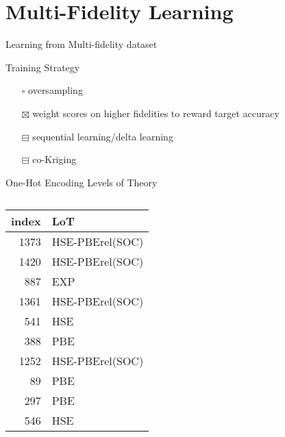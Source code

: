 \documentclass[10pt, aspectratio=169, presentation]{beamer}
\begin{document}
\section{Multi-Fidelity Learning}
\label{sec:orgacc14e3}
\begin{frame}[label={sec:org4baaeb2}]{Learning from Multi-fidelity dataset}
\begin{block}{Training Strategy}
\begin{itemize}
\item[{$\square$}] oversampling
\item[{$\boxtimes$}] weight scores on higher fidelities to reward target accuracy
\item[{$\boxminus$}] sequential learning/delta learning
\item[{$\boxminus$}] co-Kriging
\end{itemize}
\end{block}

\begin{block}{One-Hot Encoding Levels of Theory}
\begin{columns}
\begin{column}{0.3\columnwidth}
\scriptsize
\begin{center}
\begin{tabular}{rl}
index & LoT\\[0pt]
\hline
1373 & HSE-PBErel(SOC)\\[0pt]
1420 & HSE-PBErel(SOC)\\[0pt]
887 & EXP\\[0pt]
1361 & HSE-PBErel(SOC)\\[0pt]
541 & HSE\\[0pt]
388 & PBE\\[0pt]
1252 & HSE-PBErel(SOC)\\[0pt]
89 & PBE\\[0pt]
297 & PBE\\[0pt]
546 & HSE\\[0pt]
\end{tabular}
\end{center}
\end{column}


\end{columns}
\end{block}
\end{frame}
\end{document}
